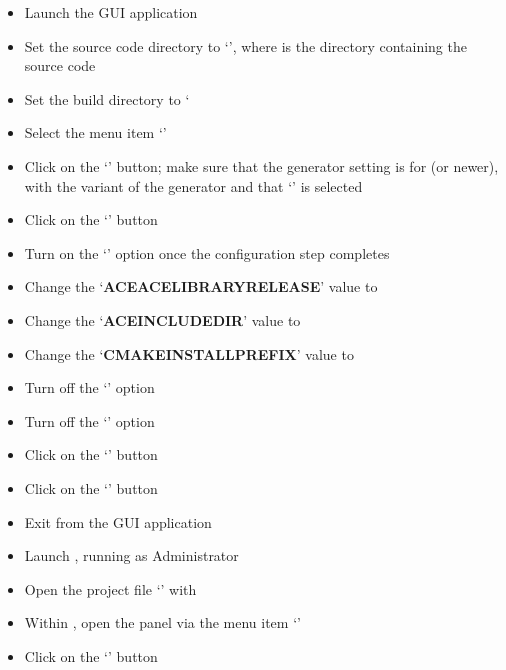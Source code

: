 \begin{itemize}
\item Launch the  GUI application
\item\exSp{}Set the source code directory to `',
where  is the directory containing the \mplusm{} source code
\item\exSp{}Set the build directory to `
\item\exSp{}Select the menu item `'
\item\exSp{}Click on the `' button; make sure that the generator
setting is for  (or newer), with the  variant of
the generator and that `' is selected
\item\exSp{}Click on the `' button
\item\exSp{}Turn on the `' option once the configuration step completes
\item\exSp{}Change the `\textbf{ACE\fUS{}ACE\fUS{}LIBRARY\fUS{}RELEASE}' value to
\item\exSp{}Change the `\textbf{ACE\fUS{}INCLUDE\fUS{}DIR}' value to
\item\exSp{}Change the `\textbf{CMAKE\fUS{}INSTALL\fUS{}PREFIX}' value to
\item\exSp{}Turn off the `' option
\item\exSp{}Turn off the `' option
\item\exSp{}Click on the `' button
\item\exSp{}Click on the `' button
\item\exSp{}Exit from the  GUI application
\item\exSp{}Launch , running as Administrator
\item\exSp{}Open the project file
`' with
\item\exSp{}Within , open the  panel via the
menu item `'
\item\exSp{}Click on the `' button

\end{itemize}
